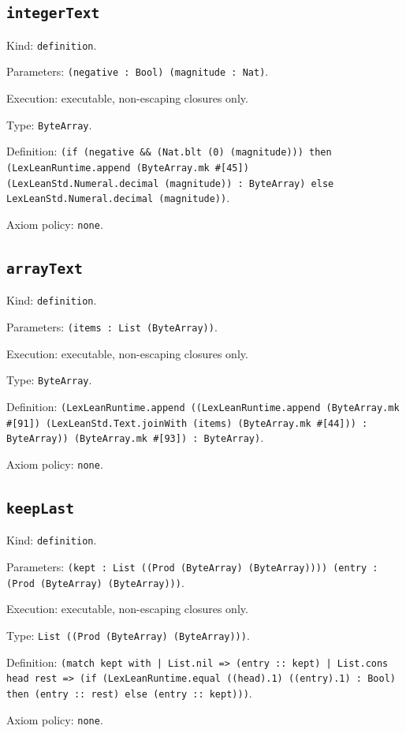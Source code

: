 \documentclass[11pt]{article}
\begin{document}
\subsection*{\texttt{integerText}}
\noindent Kind: \texttt{definition}.\par
\noindent Parameters: \texttt{(negative : Bool) (magnitude : Nat)}.\par
\noindent Execution: executable, non-escaping closures only.\par
\noindent Type: \texttt{ByteArray}.\par
\noindent Definition: \texttt{(if (negative \&\& (Nat.blt (0) (magnitude))) then (LexLeanRuntime.append (ByteArray.mk \#[45]) (LexLeanStd.Numeral.decimal (magnitude)) : ByteArray) else LexLeanStd.Numeral.decimal (magnitude))}.\par
\noindent Axiom policy: \texttt{none}.\par
\subsection*{\texttt{arrayText}}
\noindent Kind: \texttt{definition}.\par
\noindent Parameters: \texttt{(items : List (ByteArray))}.\par
\noindent Execution: executable, non-escaping closures only.\par
\noindent Type: \texttt{ByteArray}.\par
\noindent Definition: \texttt{(LexLeanRuntime.append ((LexLeanRuntime.append (ByteArray.mk \#[91]) (LexLeanStd.Text.joinWith (items) (ByteArray.mk \#[44])) : ByteArray)) (ByteArray.mk \#[93]) : ByteArray)}.\par
\noindent Axiom policy: \texttt{none}.\par
\subsection*{\texttt{keepLast}}
\noindent Kind: \texttt{definition}.\par
\noindent Parameters: \texttt{(kept : List ((Prod (ByteArray) (ByteArray)))) (entry : (Prod (ByteArray) (ByteArray)))}.\par
\noindent Execution: executable, non-escaping closures only.\par
\noindent Type: \texttt{List ((Prod (ByteArray) (ByteArray)))}.\par
\noindent Definition: \texttt{(match kept with | List.nil => (entry :: kept) | List.cons head rest => (if (LexLeanRuntime.equal ((head).1) ((entry).1) : Bool) then (entry :: rest) else (entry :: kept)))}.\par
\noindent Axiom policy: \texttt{none}.\par
\end{document}
